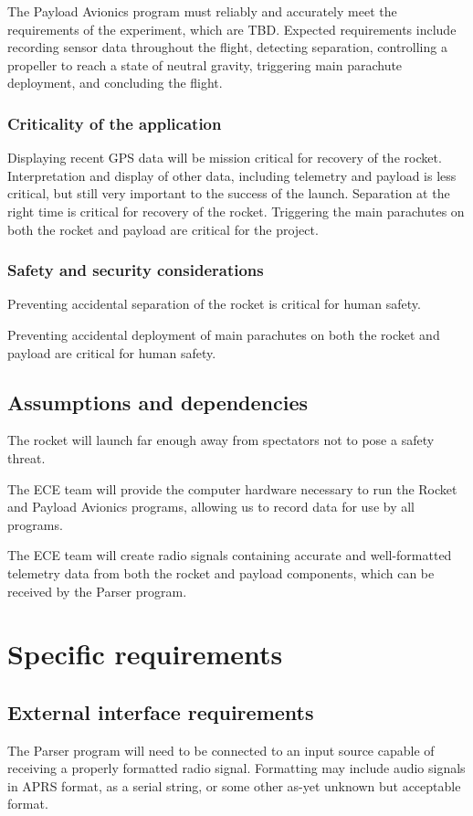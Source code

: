 \documentclass[onecolumn, draftclsnofoot, 10pt, compsoc]{IEEEtran}
\begin{document}
The Payload Avionics program must reliably and accurately meet the requirements of the experiment, which are TBD.  Expected requirements include recording sensor data throughout the flight, detecting separation, controlling a propeller to reach a state of neutral gravity, triggering main parachute deployment, and concluding the flight.

\subsubsection{Criticality of the application}
Displaying recent GPS data will be mission critical for recovery of the rocket. Interpretation and display of other data, including telemetry and payload is less critical, but still very important to the success of the launch. Separation at the right time is critical for recovery of the rocket.  Triggering the main parachutes on both the rocket and payload are critical for the project.

\subsubsection{Safety and security considerations}
Preventing accidental separation of the rocket is critical for human safety.

Preventing accidental deployment of main parachutes on both the rocket and payload are critical for human safety.

\subsection{Assumptions and dependencies}
The rocket will launch far enough away from spectators not to pose a safety threat.

The ECE team will provide the computer hardware necessary to run the Rocket and Payload Avionics programs, allowing us to record data for use by all programs.

The ECE team will create radio signals containing accurate and well-formatted telemetry data from both the rocket and payload components, which can be received by the Parser program.

\section{Specific requirements}
\subsection{External interface requirements}
The Parser program will need to be connected to an input source capable of receiving a properly formatted radio signal.  Formatting may include audio signals in APRS format, as a serial string, or some other as-yet unknown but acceptable format.
\end{document}
